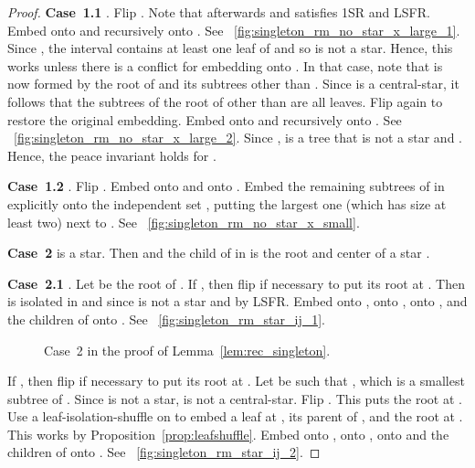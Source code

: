 \documentclass[11pt,a4paper,colorlinks=true,urlcolor=blue,citecolor=red]{article}
\theoremstyle{plain}
\newcommand{\case}[1]{\par\vspace{.5\baselineskip}\noindent\textbf{\sffamily Case~#1}}
\begin{document}
\begin{proof}
  \case{1.1} . Flip . Note that afterwards
   and  satisfies 1SR and LSFR.
  Embed  onto  and  recursively onto . See
  \figurename~\ref{fig:singleton_rm_no_star_x_large_1}. Since , the interval  contains at least one leaf of  and so
   is not a star. Hence, this works unless there is a
  conflict for embedding  onto . In that case, note
  that  is now formed by the root of  and its
  subtrees other than . Since  is a
  central-star, it follows that the subtrees of the root  of 
  other than  are all leaves. Flip  again to restore the
  original embedding. Embed  onto  and  recursively onto
  . See \figurename~\ref{fig:singleton_rm_no_star_x_large_2}.
  Since ,  is a tree that is not a star and
  . Hence, the peace invariant holds for
  .

  \case{1.2} . Flip . Embed  onto  and  onto
  . Embed the remaining subtrees of  in  explicitly onto the
  independent set , putting the largest one (which has size
  at least two) next to . See
  \figurename~\ref{fig:singleton_rm_no_star_x_small}.

  \case{2}  is a star. Then  and the child  of 
  in  is the root and center of a star .

  \case{2.1} . Let  be the root of . If
  , then flip  if necessary to put its root at
  . Then  is isolated in  and 
  since  is not a star and by LSFR. Embed  onto ,  onto
  ,  onto , and the children of  onto . See
  \figurename~\ref{fig:singleton_rm_star_ij_1}.

  \begin{figure}[t]
    \centering\hfil {}\hfil {}\hfil {}\hfil {}\hfil {}\hfil \caption{Case~2 in the proof of Lemma~\ref{lem:rec_singleton}.}
  \end{figure}

  If , then flip  if necessary to put its root
  at . Let  be such that , which is
  a smallest subtree of . Since  is not a star, 
  is not a central-star. Flip . This
  puts the root  at . Use a leaf-isolation-shuffle on 
  to embed a leaf at , its parent of , and the root at .
  This works by Proposition~\ref{prop:leafshuffle}. Embed  onto ,
   onto ,  onto  and the children of  onto .
  See \figurename~\ref{fig:singleton_rm_star_ij_2}.


\end{proof}
\end{document}

